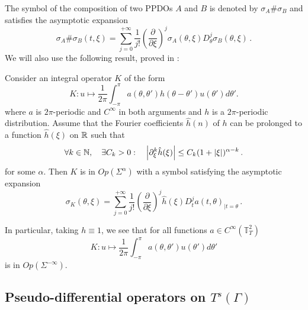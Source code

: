 \documentclass[a4paper]{article}
\begin{document}
The symbol of the composition of two PPDOs $A$ and $B$ is denoted by $\sigma_A \# \sigma_B$ and satisfies the asymptotic expansion
\begin{equation}
	\label{a_diese_b}
	\sigma_A \# \sigma_B(t,\xi) = \sum_{j = 0}^{+\infty}\frac{1}{j!} \left(\frac{\partial}{\partial \xi}\right)^j \sigma_A(\theta,\xi) D_\theta^j \sigma_B(\theta,\xi)\,.
\end{equation}
We will also use the following result, proved in \cite{thrunen1998symbol}:
\begin{Prop}
	\label{thrunen}
	Consider an integral operator $K$ of the form 
	\[K : u \mapsto \frac{1}{2\pi}\int_{-\pi}^\pi a(\theta,\theta') h(\theta-\theta') u(\theta') d\theta'.\]
	where $a$ is $2\pi$-periodic and $C^{\infty}$ in both arguments and $h$ is a $2\pi$-periodic distribution. Assume that the Fourier coefficients $\hat{h}(n)$ of $h$ can be prolonged to a function $\hat{h}(\xi)$ on $\mathbb{R}$ such that
	\[\forall k \in \mathbb{N}, \quad \exists C_k > 0: \quad \left\lvert \partial^k_\xi \hat{h}(\xi) \right\rvert \leq C_k (1 + \left\lvert \xi \right\rvert)^{\alpha - k}\,.\]
	for some $\alpha$. Then $K$ is in $\textit{Op}(\Sigma^\alpha)$ with a symbol satisfying the asymptotic expansion
	\begin{equation}
	\label{FormuleIntegralOperatorSymbol}
		\sigma_K(\theta, \xi) = \sum_{j = 0}^{+ \infty} \frac{1}{j!} \left(\frac{\partial}{\partial \xi}\right)^j \hat{h}(\xi) D_{t}^ja(t,\theta)_{| t= \theta}\,.
	\end{equation}
\end{Prop}
\noindent In particular, taking $h \equiv 1$, we see that for all functions $a \in C^{\infty}(\mathbb{T}_T^2)$
\[K : u \mapsto \frac{1}{2\pi}\int_{-\pi}^{\pi} a(\theta,\theta') u(\theta') d\theta'\]
is in $Op\left(\Sigma^{-\infty}\right)$.

\subsection{Pseudo-differential operators on $T^s(\Gamma)$}
\end{document}
